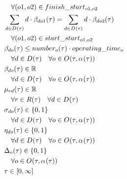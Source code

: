 \begin{alignat}{2}
	& \quad \forall (o1, o2) \in finish\_start_{o1, o2}                                                           \\ 
	& \sum_{d \in D_{}(\tau)} d \cdot \beta_{do1}(\tau) = \sum_{d \in D_{}(\tau)} d \cdot \beta_{do2}(\tau)  \notag                               \\ 
	& \quad \forall (o1, o2) \in start\_start_{o1, o2}                                                       \\ 
	& \beta_{do}(\tau) \leq number_{o}(\tau) \cdot operating\_time_{o} \notag                                                     \\ 
	& \quad \forall d \in D_{}(\tau) \quad \forall o \in O_{}(\tau, \alpha_{}(\tau))                                                                  \\
	& \beta_{do}(\tau) \in \mathbb{R} \quad \notag\\
	& \quad \forall d \in D_{}(\tau) \quad \forall o \in O_{}(\tau, \alpha_{}(\tau))                                         \\
	& \mu_{r d}(\tau) \in \mathbb{R} \quad\notag\\
	& \quad \forall r \in R(\tau) \quad \forall d \in D_{}(\tau)                                        \\
	& \sigma_{do}(\tau) \in \{0, 1\}\quad \notag\\
	& \quad \forall d \in D_{}(\tau) \quad \forall o \in O_{}(\tau, \alpha_{}(\tau)) \\
	& \eta_{do}(\tau) \in \{0, 1\}\quad \notag\\
	& \quad \forall d \in D_{}(\tau) \quad \forall o \in O_{}(\tau, \alpha_{}(\tau)) \\
	& \Delta_{o}(\tau) \in \{0, 1\} \\
	& \quad \forall o \in O_{}(\tau, \alpha_{}(\tau))                                      \\
	& \tau \in  [0, \infty] 
\end{alignat}

